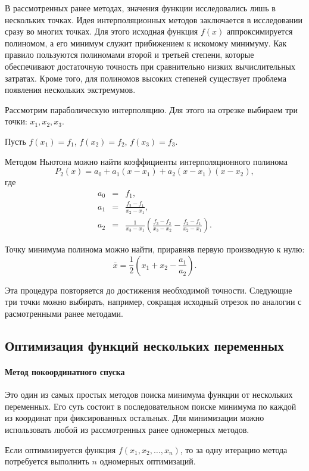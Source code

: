 В рассмотренных ранее методах, значения функции исследовались лишь
в нескольких точках. Идея интерполяционных методов заключается в исследовании
сразу во многих точках. Для этого исходная функция $f(x)$ аппроксимируется
полиномом, а его минимум служит прибижением к искомому минимуму. Как
правило пользуются полиномами второй и третьей степени, которые обеспечивают
достаточную точность при сравнительно низких вычислительных затратах.
Кроме того, для полиномов высоких степеней существует проблема появления
нескольких экстремумов.

Рассмотрим параболическую интерполяцию. Для этого на отрезке выбираем
три точки: $x_{1},x_{2},x_{3}.$

Пусть $f(x_{1})=f_{1}$, $f(x_{2})=f_{2}$, $f(x_{3})=f_{3}$.

Методом Ньютона можно найти коэффициенты интерполяционного полинома
\[
P_{2}(x)=a_{0}+a_{1}(x-x_{1})+a_{2}(x-x_{1})(x-x_{2}),
\]
где
\begin{eqnarray*}
a_{0} & = & f_{1},\\
a_{1} & = & \frac{f_{2}-f_{1}}{x_{2}-x_{1}},\\
a_{2} & = & \frac{1}{x_{3}-x_{1}}\left(\frac{f_{3}-f_{2}}{x_{3}-x_{2}}-\frac{f_{2}-f_{1}}{x_{2}-x_{1}}\right).
\end{eqnarray*}


Точку минимума полинома можно найти, приравняв первую производную
к нулю:
\[
\bar{x}=\frac{1}{2}(x_{1}+x_{2}-\frac{a_{1}}{a_{2}}).
\]


Эта процедура повторяется до достижения необходимой точности. Следующие
три точки можно выбирать, например, сокращая исходный отрезок по аналогии
с расмотренными ранее методами.


\subsection{Оптимизация функций нескольких переменных}


\paragraph{Метод покоординатного спуска}

Это один из самых простых методов поиска минимума функции от нескольких
переменных. Его суть состоит в последовательном поиске минимума по
каждой из координат при фиксированных остальных. Для минимизации можно
использовать любой из рассмотренных ранее одномерных методов.

Если оптимизируется функция $f(x_{1},x_{2},\dots,x_{n})$, то за одну
итерацию метода потребуется выполнить $n$ одномерных оптимизаций.

